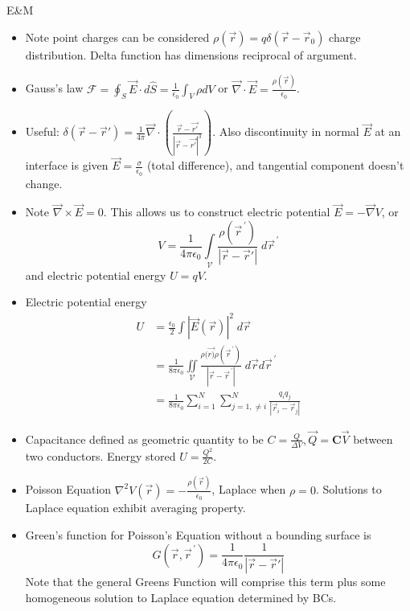 \documentclass[10pt]{report}
\newcommand{\curl}[0]{\vec{\nabla}\times}
\newcommand{\pvec}[1]{\vec{#1}^{\,\prime}}
\newcommand{\grad}[0]{\vec{\nabla}}
\newcommand{\abs}[1]{\left|#1\right|}
\begin{document}
\begin{center}{\LARGE E\&M}\end{center}
\begin{itemize}
    \item Note point charges can be considered $\rho(\vec{r}) = q\delta(\vec{r} - \vec{r}_0)$ charge distribution. Delta function has dimensions reciprocal of argument.
    \item Gauss's law $\mathcal{F} = \oint_S\vec{E}\cdot d\hat{S} = \frac{1}{\epsilon_0}\int_V \rho dV$ or $\vec{\nabla}\cdot \vec{E} = \frac{\rho(\vec{r})}{\epsilon_0}$. 
    \item Useful: $\delta(\vec{r} - \vec{r}') = \frac{1}{4\pi}\vec{\nabla} \cdot \left( \frac{\vec{r} - \vec{r'}}{\abs{\vec{r} - \vec{r'}}^3} \right)$. Also discontinuity in normal $\vec{E}$ at an interface is given $\vec{E} = \frac{\sigma}{\epsilon_0}$ (total difference), and tangential component doesn't change.
    \item Note $\curl \vec{E} = 0$. This allows us to construct electric potential $\vec{E} = -\grad V$, or 
        $$V = \frac{1}{4\pi \epsilon_0}\displaystyle\int\limits_{\mathcal{V}}^{}\frac{\rho(\pvec{r})}{\abs{\vec{r} - \vec{r}'}}\;d\vec{r}^{\,\prime}$$
        and electric potential energy $U = qV$. 
    \item Electric potential energy 
        \begin{align}
            U &= \frac{\epsilon_0}{2}\int\abs{\vec{E}(\vec{r})}^2\; d\vec{r}\\
            &= \frac{1}{8\pi\epsilon_0}\iint\limits_\mathcal{V} \frac{\rho(\vec{r)}\rho(\vec{r}^{\,\prime})}{\abs{\vec{r} - \vec{r}^{\,\prime}}}\; d\vec{r}d\vec{r}^{\,\prime}\\
            &= \frac{1}{8\pi\epsilon_0}\sum_{i=1}^{N}\sum_{j=1, \neq i}^{N}\frac{q_iq_j}{\abs{\vec{r}_i - \vec{r}_j}}
        \end{align}
    \item Capacitance defined as geometric quantity to be $C = \frac{Q}{\Delta V}, \vec{Q} = \mathbf{C}\vec{V}$ between two conductors. Energy stored $U=\frac{Q^2}{2C}$.
    \item Poisson Equation $\nabla^2 V(\vec{r}) = -\frac{\rho(\vec{r})}{\epsilon_0}$, Laplace when $\rho = 0$. Solutions to Laplace equation exhibit averaging property. 
    \item Green's function for Poisson's Equation without a bounding surface is
        $$G(\vec{r}, \pvec{r}) = \frac{1}{4\pi\epsilon_0}\frac{1}{\abs{\vec{r} - \vec{r}'}}$$
        Note that the general Greens Function will comprise this term plus some homogeneous solution to Laplace equation determined by BCs. 

\end{itemize}
\end{document}
